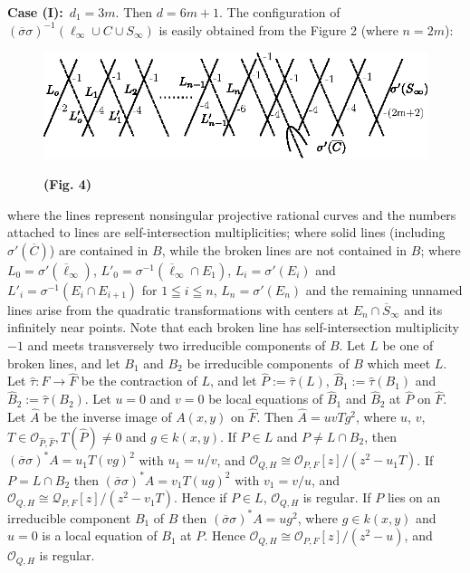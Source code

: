 \noindent
{\bf Case (I):}~$d_{1}=3m$. Then $d=6m+1$. The configuration of
$(\overline{\sigma}\sigma)^{-1}(\ell_{\infty}\cup C\cup S_{\infty})$
is easily obtained from the Figure 2 (where $n=2m$):
\begin{figure}[H]
\centering
\includegraphics[scale=1.1]{figures/miyansi_fig4.eps}

\bigskip
\centerline{\bf(Fig. 4)}
\end{figure}
\noindent
where the lines represent nonsingular projective rational curves and
the numbers attached to lines are self-intersection multiplicities;
where solid lines (including $\sigma'(\overline{C})$) are contained in
$B$, while the broken lines are not contained in $B$; where
$L_{0}=\sigma'(\overline{\ell}_{\infty})$,
$L'_{0}=\sigma^{-1}(\overline{\ell}_{\infty}\cap E_{1})$,
$L_{i}=\sigma'(E_{i})$ and $L'_{i}=\sigma^{-1}(E_{i}\cap E_{i+1})$ for
$1\leqq i\leqq n$, $L_{n}=\sigma'(E_{n})$ and the remaining unnamed
lines arise from the quadratic transformations with centers at
$E_{n}\cap \overline{S}_{\infty}$ and its infinitely near points. Note
that each broken line has self-intersection multiplicity $-1$ and
meets transversely two irreducible components of $B$. Let $L$ be one
of broken lines, and let $B_{1}$ and $B_{2}$ be irreducible
components\pageoriginale\ of $B$ which meet $L$. Let
$\widehat{\tau}:F\to \widehat{F}$ be the contraction of $L$, and let
$\widehat{P}:=\widehat{\tau}(L)$,
$\widehat{B}_{1}:=\widehat{\tau}(B_{1})$ and
$\widehat{B}_{2}:=\widehat{\tau}(B_{2})$. Let $u=0$ and $v=0$ be local
equations of $\widehat{B}_{1}$ and $\widehat{B}_{2}$ at $\widehat{P}$
on $\widehat{F}$. Let $\widehat{A}$ be the inverse image of $A(x,y)$
on $\widehat{F}$. Then $\widehat{A}=uvTg^{2}$, where $u$, $v$, $T\in
\mathscr{O}_{\widehat{P},\widehat{F}},T(\widehat{P})\neq 0$ and $g\in
k(x,y)$. If $P\in L$ and $P\neq L\cap B_{2}$, then
$(\overline{\sigma}\sigma)^{\ast}A=u_{1}T(vg)^{2}$ with $u_{1}=u/v$,
and $\mathscr{O}_{Q,H}\cong \mathscr{O}_{P,F}[z]/(z^{2}-u_{1}T)$. If
$P=L\cap B_{2}$ then
$(\overline{\sigma}\sigma)^{\ast}A=v_{1}T(ug)^{2}$ with $v_{1}=v/u$,
and $\mathscr{O}_{Q,H}\cong
\mathscr{Q}_{P,F}[z]/(z^{2}-v_{1}T)$. Hence if $P\in L$,
$\mathscr{O}_{Q,H}$ is regular. If $P$ lies on an irreducible
component $B_{1}$ of $B$ then
$(\overline{\sigma}\sigma)^{\ast}A=ug^{2}$, where $g\in k(x,y)$ and
$u=0$ is a local equation of $B_{1}$ at $P$. Hence
$\mathscr{O}_{Q,H}\cong \mathscr{O}_{P,F}[z]/(z^{2}-u)$, and
$\mathscr{O}_{Q,H}$ is regular.

